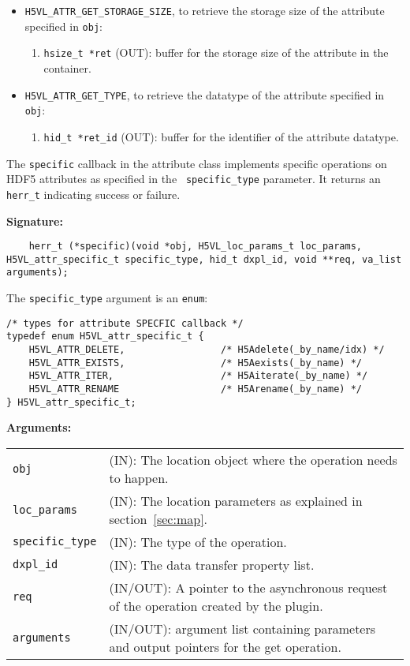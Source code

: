 \begin{itemize}
\item {\tt H5VL\_ATTR\_GET\_STORAGE\_SIZE}, to retrieve the storage
  size of the attribute specified in {\tt obj}:
  \begin{enumerate}
  \item {\tt hsize\_t *ret} (OUT): buffer for the storage size of
    the attribute in the container.
  \end{enumerate}

\item {\tt H5VL\_ATTR\_GET\_TYPE}, to retrieve the datatype of the
  attribute specified in {\tt obj}:
  \begin{enumerate}
  \item {\tt hid\_t *ret\_id} (OUT): buffer for the identifier of the
    attribute datatype.
  \end{enumerate}
  
\end{itemize}

The {\tt specific} callback in the attribute class implements specific operations on HDF5 attributes as specified in the {\tt
  specific\_type} parameter. It returns an {\tt herr\_t} indicating success or failure.

\textbf{Signature:}
\begin{lstlisting}
	herr_t (*specific)(void *obj, H5VL_loc_params_t loc_params, H5VL_attr_specific_t specific_type, hid_t dxpl_id, void **req, va_list arguments);
\end{lstlisting}

The {\tt specific\_type} argument is an {\tt enum}:
\begin{lstlisting}
/* types for attribute SPECFIC callback */
typedef enum H5VL_attr_specific_t {
    H5VL_ATTR_DELETE,                 /* H5Adelete(_by_name/idx) */
    H5VL_ATTR_EXISTS,                 /* H5Aexists(_by_name) */
    H5VL_ATTR_ITER,                   /* H5Aiterate(_by_name) */
    H5VL_ATTR_RENAME                  /* H5Arename(_by_name) */
} H5VL_attr_specific_t;
\end{lstlisting}

\textbf{Arguments:}\\
\begin{tabular}{l p{10cm}}
  {\tt obj} & (IN): The location object  where the operation needs to happen.\\
  {\tt loc\_params} & (IN): The location parameters as explained in section~\ref{sec:map}.\\
  {\tt specific\_type} & (IN): The type of the operation.\\
  {\tt dxpl\_id} & (IN): The data transfer property list.\\
  {\tt req} & (IN/OUT): A pointer to the asynchronous request of the
  operation created by the plugin.\\
  {\tt arguments} & (IN/OUT): argument list containing parameters and
  output pointers for the get operation. \\
\end{tabular}

